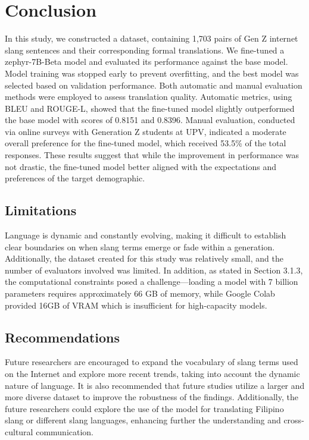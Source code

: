 \chapter{Conclusion}
In this study, we constructed a dataset, containing 1,703 pairs of Gen Z internet slang sentences and their corresponding formal translations. We fine-tuned a zephyr-7B-Beta model and  evaluated its performance against the base model. Model training was stopped early to prevent overfitting, and the best model was selected based on validation performance. Both automatic and manual evaluation methods were employed to assess translation quality. Automatic metrics, using BLEU and ROUGE-L, showed that the fine-tuned model slightly outperformed the base model with scores of 0.8151 and 0.8396. Manual evaluation, conducted via online surveys with Generation Z students at UPV, indicated a moderate overall preference for the fine-tuned model, which received 53.5\% of the total responses. These results suggest that while the improvement in performance was not drastic, the fine-tuned model better aligned with the expectations and preferences of the target demographic.

\section{Limitations}
Language is dynamic and constantly evolving, making it difficult to establish clear boundaries on when slang terms emerge or fade within a generation. Additionally, the dataset created for this study was relatively small, and the number of evaluators involved was limited. In addition, as stated in Section 3.1.3, the computational constraints posed a challenge—loading a model with 7 billion parameters requires approximately 66 GB of memory, while Google Colab provided 16GB of VRAM which is insufficient for high-capacity models.

\section{Recommendations}
Future researchers are encouraged to expand the vocabulary of slang terms used on the Internet and explore more recent trends, taking into account the dynamic nature of language. It is also recommended that future studies utilize a larger and more diverse dataset to improve the robustness of the findings. Additionally, the future researchers could explore the use of the model for translating Filipino slang or different slang languages, enhancing further the understanding and cross-cultural communication.